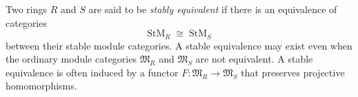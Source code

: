 Two rings $R$ and $S$ are said to be {\it stably equivalent} if there is an equivalence of categories
\[
\operatorname{StM}_R \cong \operatorname{StM}_S
\]
between their stable module categories. A stable equivalence may exist even when the ordinary module categories $\mathfrak{M}_R$ and $\mathfrak{M}_S$ are not equivalent. A stable equivalence is often induced by a functor $F : \mathfrak{M}_R \to \mathfrak{M}_S$ that preserves projective homomorphisms.
